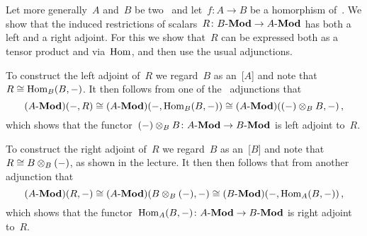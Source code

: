 \section{}





\subsection{}

Let more generally~$A$ and~$B$ be two~{\kalg} and let~$f \colon A \to B$ be a homorphism of~{\kalgs}.
We show that the induced restrictions of scalars~$R \colon \text{$B$-$\mathbf{Mod}$} \to \text{$A$-$\mathbf{Mod}$}$ has both a left and a right adjoint.
For this we show that~$R$ can be expressed both as a tensor product and via~$\Hom$, and then use the usual \dash{$\tensor$}{$\Hom$} adjunctions.

To construct the left adjoint of~$R$ we regard~$B$ as an~{[$A$]} and note that~$R \cong \operatorname{Hom}_B(B, -)$.
It then follows from one of the~\dash{$\tensor$}{$\Hom$} adjunctions that
\[
        (\text{$A$-$\mathbf{Mod}$})(-, R)
  \cong (\text{$A$-$\mathbf{Mod}$})(-, \operatorname{Hom}_B(B, -))
  \cong (\text{$A$-$\mathbf{Mod}$})((-) \otimes_B B, -) \,,
\]
which shows that the functor~$(-) \otimes_B B \colon \text{$A$-$\mathbf{Mod}$} \to \text{$B$-$\mathbf{Mod}$}$ is left adjoint to~$R$.


To construct the right adjoint of~$R$ we regard~$B$ as an~{[$B$]} and note that~$R \cong B \otimes_B (-)$, as shown in the lecture.
It then then follows that from another~\dash{$\tensor$}{$\Hom$} adjunction that
\[
        (\text{$A$-$\mathbf{Mod}$})(R, -)
  \cong (\text{$A$-$\mathbf{Mod}$})(B \otimes_B (-), -)
  \cong (\text{$B$-$\mathbf{Mod}$})(-, \operatorname{Hom}_A(B, -)) \,,
\]
which shows that the functor~$\operatorname{Hom}_A(B,-) \colon \text{$A$-$\mathbf{Mod}$} \to \text{$B$-$\mathbf{Mod}$}$ is right adjoint to~$R$.





\subsection{}

